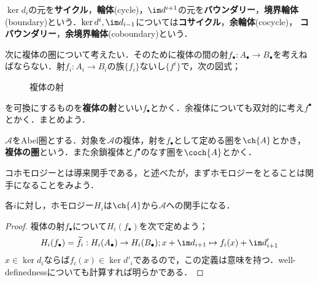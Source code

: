\begin{defi}
	$\ker d_i$の元を\textbf{サイクル}，\textbf{輪体}(cycle)，$\im d^{i+1}$の元を\textbf{バウンダリー}，\textbf{境界輪体}(boundary)という．$\ker d^i,\im d_{i-1}$については\textbf{コサイクル}，\textbf{余輪体}(cocycle)， \textbf{コバウンダリー}，\textbf{余境界輪体}(coboundary)という．
\end{defi}

次に複体の圏について考えたい．そのために複体の間の射$f_\bullet:A_\bullet\to B_\bullet$を考えねばならない．射$f_i:A_i\to B_i$の族$\{f_i\}$ないし$\{f^i\}$で，次の図式；

	\begin{figure}[H]
		\centering
		\caption{複体の射}
	\end{figure}

を可換にするものを\textbf{複体の射}といい$f_\bullet$とかく．余複体についても双対的に考え$f^\bullet$とかく．まとめよう．
\begin{defi}[複体の圏]
	$\mathscr{A}$をAbel圏とする．対象を$\mathscr{A}$の複体，射を$f_\bullet$として定める圏を$\ch{A}$とかき，\textbf{複体の圏}という．また余鎖複体と$f^\bullet$のなす圏を$\coch{A}$とかく．
\end{defi}

コホモロジーとは導来関手である，と述べたが，まずホモロジーをとることは関手になることをみよう．
\begin{prop}
	各$i$に対し，ホモロジー$H_i$は$\ch{A}$から$\mathscr{A}$への関手になる．
\end{prop}
\begin{proof}
	複体の射$f_\bullet$について$H_i(f_\bullet)$を次で定めよう；
	\[H_i(f_\bullet)=\widetilde{f}_i:H_i(A_\bullet)\to H_i(B_\bullet);x+\im d_{i+1}\mapsto f_i(x)+\im d_{i+1}'\]
	$x\in\ker d_i$ならば$f_i(x)\in\ker d'_i$であるので，この定義は意味を持つ．well-definednessについても計算すれば明らかである．
\end{proof}


